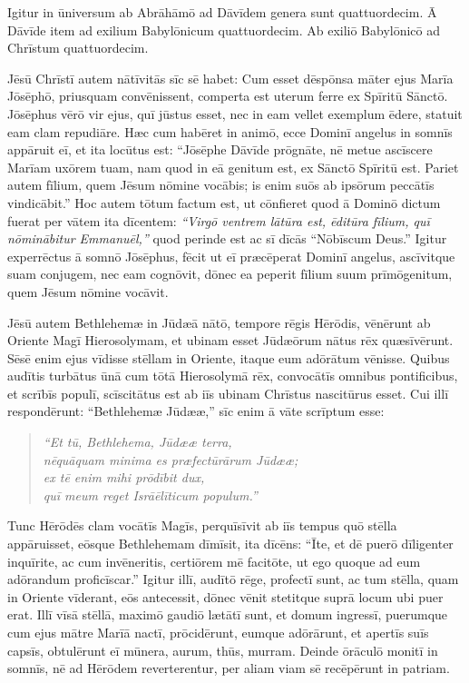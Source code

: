 \Versus Igitur in ūniversum ab Abrāhāmō ad Dāvīdem genera sunt quattuordecim. Ā Dāvīde item ad exilium Babylōnicum quattuordecim. Ab exiliō Babylōnicō ad Chrīstum quattuordecim.

\Versus Jēsū Chrīstī autem nātīvitās sīc sē habet: Cum esset dēspōnsa māter ejus Marīa Jōsēphō, priusquam convēnissent, comperta est uterum ferre ex Spīritū Sānctō. 
\Versus Jōsē\-phus vērō vir ejus, quī jūstus esset, nec in eam vellet exemplum ēdere, statuit eam clam repudiāre. 
\Versus Hæc cum habēret in animō, ecce Dominī angelus in somnīs appāruit eī, et ita locūtus est: ``Jōsēphe Dāvīde prōgnāte, nē metue ascīscere Marīam uxōrem tuam, nam quod in eā genitum est, ex Sānctō Spīritū est. 
\Versus Pariet autem fīlium, quem Jēsum nōmine vocābis; is enim suōs ab ipsōrum peccātīs vindicābit.'' 
\Versus Hoc autem tōtum factum est, ut cōnfieret quod ā Dominō dictum fuerat per vātem ita dīcentem: 
\Versus \emph{``Virgō ventrem lātūra est, ēditūra fīlium, quī nōminābitur Emmanuēl,''} quod perinde est ac sī dīcās ``Nōbīscum Deus.'' 
\Versus Igitur experrēctus ā somnō Jōsēphus, fēcit ut eī præcēperat Dominī angelus, ascīvitque suam conjugem, 
\Versus nec eam cognōvit, dōnec ea peperit fīlium suum prīmōgenitum, quem Jēsum nōmine vocāvit.
 

\Caput
\Versus Jēsū autem Bethlehemæ in Jūdæā nātō, tempore rēgis Hērōdis, vēnērunt ab Oriente Magī Hierosolymam, 
\Versus et ubinam esset Jūdæōrum nātus rēx quæsīvērunt. Sēsē enim ejus vīdisse stēllam in Oriente, itaque eum adōrātum vēnisse. 
\Versus Quibus audītis turbātus ūnā cum tōtā Hierosolymā rēx, 
\Versus convocātīs omnibus pontificibus, et scrībīs populī, scīscitātus est ab iīs ubinam Chrīstus nascitūrus esset. 
\Versus Cui illī respondērunt: ``Bethlehemæ Jūdææ,'' sīc enim ā vāte scrīptum esse:

\begin{verse}
\begin{patverse*}
\Versus \emph{``Et tū, Bethlehema, Jūdææ terra,\\
nēquāquam minima es præfectūrārum Jūdææ;\\
ex tē enim mihi prōdībit dux,\\
quī meum reget Isrāēlīticum populum.''}
\end{patverse*}
\end{verse}

\Versus Tunc Hērōdēs clam vocātīs Magīs, perquīsīvit ab iīs tempus quō stēlla appāruisset, 
\Versus eōsque Bethlehemam dīmīsit, ita dīcēns: ``Īte, et dē puerō dīligenter inquīrite, ac cum invēneritis, certiōrem mē facitōte, ut ego quoque ad eum adōrandum proficīscar.'' 
\Versus Igitur illī, audītō rēge, profectī sunt, ac tum stēlla, quam in Oriente vīderant, eōs antecessit, dōnec vēnit stetitque suprā locum ubi puer erat. 
\Versus Illī vīsā stēllā, maximō gaudiō lætātī sunt, 
\Versus et domum ingressī, puerumque cum ejus mātre Marīā nactī, prōcidērunt, eumque adōrārunt, et apertīs suīs capsīs, obtulērunt eī mūnera, aurum, thūs, murram. 
\Versus Deinde ōrāculō monitī in somnīs, nē ad Hērōdem reverterentur, per aliam viam sē recēpērunt in patriam.

